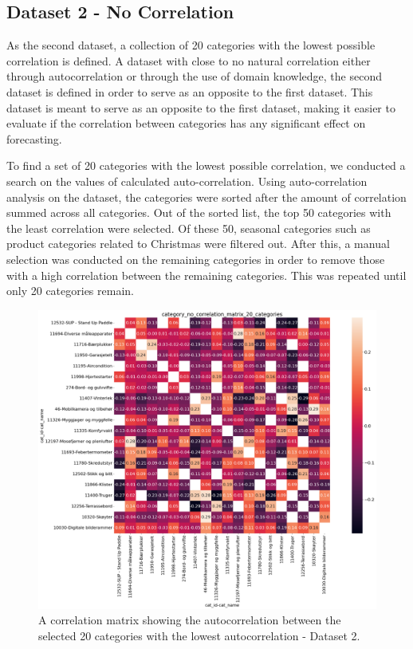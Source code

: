\subsection{Dataset 2 - No Correlation}

As the second dataset, a collection of 20 categories with the lowest possible correlation is defined.
A dataset with close to no natural correlation either through autocorrelation or through the use of domain knowledge, the second dataset is defined in order to serve as an opposite to the first dataset.
This dataset is meant to serve as an opposite to the first dataset, making it easier to evaluate if the correlation between categories has any significant effect on forecasting.

To find a set of 20 categories with the lowest possible correlation, we conducted a search on the values of calculated auto-correlation.
Using auto-correlation analysis on the dataset, the categories were sorted after the amount of correlation summed across all categories.
Out of the sorted list, the top 50 categories with the least correlation were selected.
Of these 50, seasonal categories such as product categories related to Christmas were filtered out.
After this, a manual selection was conducted on the remaining categories in order to remove those with a high correlation between the remaining categories.
This was repeated until only 20 categories remain.
\begin{figure}[h!]
  \centering
  \includegraphics[width=\textwidth]{./figs/dataset/category_no_correlation_matrix_20_categories.png}
  \hfill
  \caption{A correlation matrix showing the autocorrelation between the selected 20 categories with the lowest autocorrelation - Dataset 2.}
  \label{fig:dataset:heatmap_20_no_correlating}
\end{figure}



